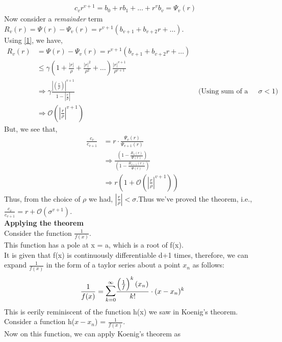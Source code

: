 \documentclass[letterpaper]{exam}
\begin{document}
\begin{questions}
\begin{solution}
\begin{align*}
    & c_{v}r^{v+1} = b_0 + rb_1 + \ldots + r^{v}b_v = \Psi_{v}(r)
\end{align*}
Now consider a \textit{remainder} term $R_v(r) = \Psi(r) - \Psi_v(r) = r^{v+1}(b_{v+1} + b_{v+2}r+ \ldots)$.\\ 
Using \ref{1}, we have,
\begin{align*}
    R_v(r) &= \Psi(r) - \Psi_v(r) = r^{v+1}(b_{v+1} + b_{v+2}r+ \ldots)\\
    & \leq \gamma\left(1+\frac{\left|r\right|}{\rho} + \frac{\left|r\right|^2}{\rho^2} + \ldots \right)\frac{\left|r\right|^{v+1}}{\rho^{v+1}}\\
    &\Rightarrow
    \gamma \frac{\left|\left(\frac{r}{\rho}\right)\right|^{v+1}}{1-\left|\frac{r}{\rho}\right|} &\mbox{ (Using sum of a GP,as $\sigma < 1 $)}\\
    &\Rightarrow
    \mathcal{O}\left(\left|\frac{r}{\rho}\right|^{v+1}\right)
\end{align*}
But, we see that,
\begin{align*}
    \frac{c_v}{c_{v+1}} &= r\cdot \frac{\Psi_v(r)}{\Psi_{v+1}(r)}\\
    &\Rightarrow
    \frac{\left(1- \frac{R_v(r)}{\Psi(r)}\right)}{\left(1- \frac{R_{v+1}(r)}{\Psi(r)}\right)}\\
    &\Rightarrow
    r\left(1 + \mathcal{O}\left(\left|\frac{r}{\rho}\right|^{v+1}\right) \right)
\end{align*}
Thus, from the choice of $\rho$ we had, $\left|\frac{r}{\rho}\right| < \sigma$.Thus we've proved the theorem, i.e., $\frac{c_v}{c_{v+1}} = r + \mathcal{O}\left(\sigma^{v+1}\right)$. \\
\textbf{Applying the theorem}\\
Consider the function $\frac{1}{f(x)}$.\\
This function has a pole at x = a, which is a root of f(x).\\
It is given that f(x) is continuously differentiable d+1 times, therefore, we can expand $\frac{1}{f(x)}$ in the form of a taylor series about a point $x_n$ as follows:
\begin{align*}
    \frac{1}{f(x)} = \overset{\infty}{\underset{k = 0}{\mathlarger{\mathlarger{\sum}}}} \frac{\left(\frac{1}{f}\right)^k(x_n)}{k!}\cdot(x-x_n)^k
\end{align*}
This is eerily reminiscent of the function h(x) we saw in Koenig's theorem.\\
Consider a function h($x-x_n$) = $\frac{1}{f(x)}$.\\
Now on this function, we can apply Koenig's theorem as

\end{solution}
\end{questions}
\end{document}
